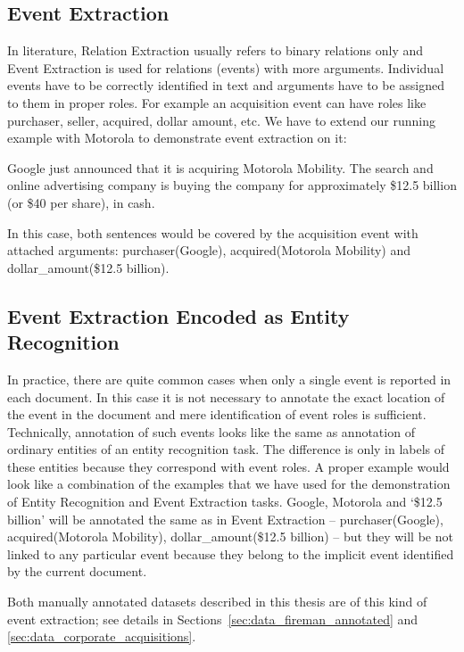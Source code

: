 \subsection{Event Extraction}

In literature, Relation Extraction usually refers to binary relations only and Event Extraction is used for relations (events) with more arguments. Individual events have to be correctly identified in text and arguments have to be assigned to them in proper roles. For example an acquisition event can have roles like purchaser, seller, acquired, dollar amount, etc. We have to extend our running example with Motorola to demonstrate event extraction on it:

Google just announced that it is acquiring Motorola Mobility. The search and online advertising company is buying the company for approximately \$12.5 billion (or \$40 per share), in cash.

In this case, both sentences would be covered by the acquisition event with attached arguments: purchaser(Google), acquired(Motorola Mobility) and dollar\_amount(\$12.5 billion).


\subsection{Event Extraction Encoded as Entity Recognition} \label{sec:problems_event_entities}

In practice, there are quite common cases when only a single event is reported in each document. In this case it is not necessary to annotate the exact location of the event in the document and mere identification of event roles is sufficient. Technically, annotation of such events looks like the same as annotation of ordinary entities of an entity recognition task. The difference is only in labels of these entities because they correspond with event roles. A proper example would look like a combination of the examples that we have used for the demonstration of Entity Recognition and Event Extraction tasks. Google, Motorola and `\$12.5 billion' will be annotated the same as in Event Extraction -- purchaser(Google), acquired(Motorola Mobility), dollar\_amount(\$12.5 billion) -- but they will be not linked to any particular event because they belong to the implicit event identified by the current document.

Both manually annotated datasets described in this thesis are of this kind of event extraction; see details in Sections~\ref{sec:data_fireman_annotated} and \ref{sec:data_corporate_acquisitions}. 


